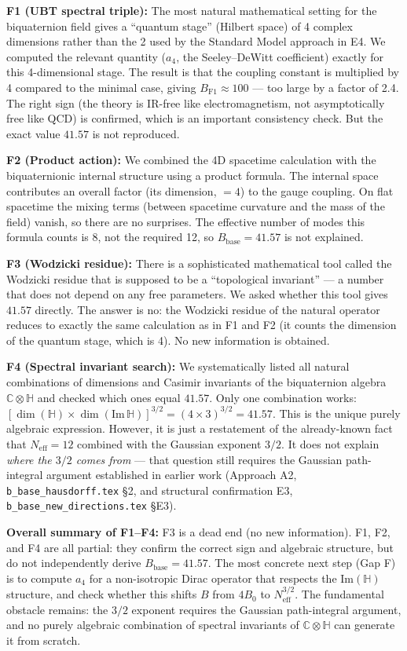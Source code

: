 \documentclass[11pt,a4paper]{article}
\theoremstyle{definition}
\theoremstyle{remark}
\begin{document}
\textbf{F1 (UBT spectral triple):}
The most natural mathematical setting for the biquaternion field gives a
``quantum stage'' (Hilbert space) of 4 complex dimensions rather than the 2 used
by the Standard Model approach in E4.
We computed the relevant quantity ($a_4$, the Seeley--DeWitt coefficient)
exactly for this 4-dimensional stage.
The result is that the coupling constant is multiplied by 4 compared to the
minimal case, giving $B_{\mathrm{F1}} \approx 100$ — too large by a factor of 2.4.
The right sign (the theory is IR-free like electromagnetism, not asymptotically
free like QCD) is confirmed, which is an important consistency check.
But the exact value $41.57$ is not reproduced.

\textbf{F2 (Product action):}
We combined the 4D spacetime calculation with the biquaternionic internal
structure using a product formula.
The internal space contributes an overall factor (its dimension, $= 4$) to the
gauge coupling.
On flat spacetime the mixing terms (between spacetime curvature and the mass
of the field) vanish, so there are no surprises.
The effective number of modes this formula counts is 8, not the required 12,
so $B_{\mathrm{base}} = 41.57$ is not explained.

\textbf{F3 (Wodzicki residue):}
There is a sophisticated mathematical tool called the Wodzicki residue that
is supposed to be a ``topological invariant'' — a number that does not depend
on any free parameters.
We asked whether this tool gives $41.57$ directly.
The answer is no: the Wodzicki residue of the natural operator reduces to
exactly the same calculation as in F1 and F2 (it counts the dimension of the
quantum stage, which is 4).
No new information is obtained.

\textbf{F4 (Spectral invariant search):}
We systematically listed all natural combinations of dimensions and Casimir
invariants of the biquaternion algebra $\mathbb{C}\otimes\mathbb{H}$ and
checked which ones equal $41.57$.
Only one combination works:
$[\dim(\mathbb{H})\times\dim(\mathrm{Im}\,\mathbb{H})]^{3/2} = (4\times 3)^{3/2} = 41.57$.
This is the unique purely algebraic expression.
However, it is just a restatement of the already-known fact that
$N_{\mathrm{eff}} = 12$ combined with the Gaussian exponent $3/2$.
It does not explain \emph{where the $3/2$ comes from} — that question still
requires the Gaussian path-integral argument established in earlier work
(Approach A2, \texttt{b\_base\_hausdorff.tex} §2, and structural
confirmation E3, \texttt{b\_base\_new\_directions.tex} §E3).

\textbf{Overall summary of F1--F4:}
F3 is a dead end (no new information).
F1, F2, and F4 are all partial: they confirm the correct sign and algebraic
structure, but do not independently derive $B_{\mathrm{base}} = 41.57$.
The most concrete next step (Gap F) is to compute $a_4$ for a non-isotropic
Dirac operator that respects the $\mathrm{Im}(\mathbb{H})$ structure, and
check whether this shifts $B$ from $4B_0$ to $N_{\mathrm{eff}}^{3/2}$.
The fundamental obstacle remains: the $3/2$ exponent requires the Gaussian
path-integral argument, and no purely algebraic combination of spectral
invariants of $\mathbb{C}\otimes\mathbb{H}$ can generate it from scratch.

\ifdefined\INCLUDEMODE\else
\end{document}
